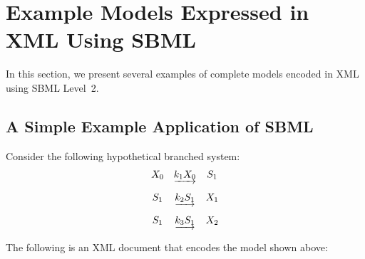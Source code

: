 \documentclass[10pt,twocolumntoc]{cekarticle}
\begin{document}
\section{Example Models Expressed in XML Using SBML}
\label{sec:xml-rep}

In this section, we present several examples of complete models
encoded in XML using SBML Level~2.  



\subsection{A Simple Example Application of SBML}
\label{sec:modeleg}

Consider the following hypothetical branched system:
\begin{equation*}
  \begin{array}{@{}ccc@{}}
    X_0 & \underrightarrow{k_1 X_0} & S_1 \\ \\[-4pt]
    S_1 & \underrightarrow{k_2 S_1} & X_1 \\ \\[-4pt]
    S_1 & \underrightarrow{k_3 S_1} & X_2
  \end{array}
\end{equation*}

The following is an XML document that encodes the model shown
above:
\end{document}
